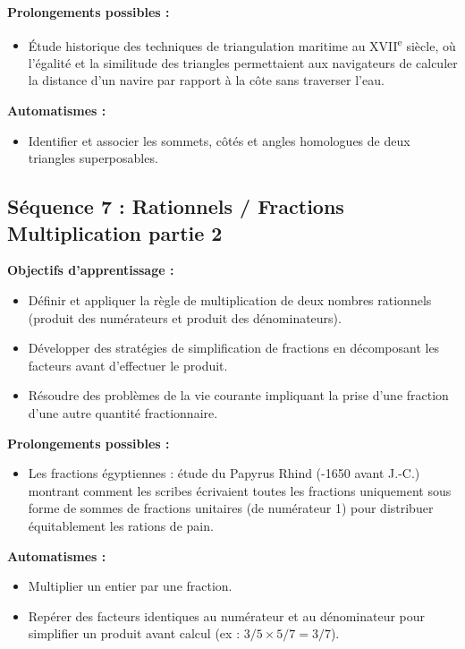 \documentclass[11pt,a4paper]{article}
\begin{document}
\textbf{Prolongements possibles :}
\begin{itemize}
    \item Étude historique des techniques de triangulation maritime au XVII\textsuperscript{e} siècle, où l'égalité et la similitude des triangles permettaient aux navigateurs de calculer la distance d'un navire par rapport à la côte sans traverser l'eau.
\end{itemize}

\textbf{Automatismes :}
\begin{itemize}
    \item Identifier et associer les sommets, côtés et angles homologues de deux triangles superposables.
\end{itemize}

\subsection{Séquence 7 : Rationnels / Fractions Multiplication partie 2}
\textbf{Objectifs d’apprentissage :}
\begin{itemize}
    \item Définir et appliquer la règle de multiplication de deux nombres rationnels (produit des numérateurs et produit des dénominateurs).
    \item Développer des stratégies de simplification de fractions en décomposant les facteurs avant d'effectuer le produit.
    \item Résoudre des problèmes de la vie courante impliquant la prise d'une fraction d'une autre quantité fractionnaire.
\end{itemize}

\textbf{Prolongements possibles :}
\begin{itemize}
    \item Les fractions égyptiennes : étude du Papyrus Rhind (-1650 avant J.-C.) montrant comment les scribes écrivaient toutes les fractions uniquement sous forme de sommes de fractions unitaires (de numérateur 1) pour distribuer équitablement les rations de pain.
\end{itemize}

\textbf{Automatismes :}
\begin{itemize}
    \item Multiplier un entier par une fraction.
    \item Repérer des facteurs identiques au numérateur et au dénominateur pour simplifier un produit avant calcul (ex : $3/5 \times 5/7 = 3/7$).
\end{itemize}
\end{document}
